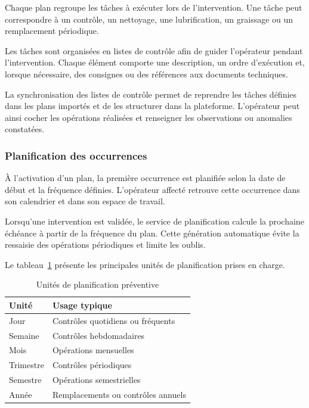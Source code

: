 Chaque plan regroupe les tâches à exécuter lors de l'intervention. Une tâche peut correspondre à un contrôle, un nettoyage, une lubrification, un graissage ou un remplacement périodique.

Les tâches sont organisées en listes de contrôle afin de guider l'opérateur pendant l'intervention. Chaque élément comporte une description, un ordre d'exécution et, lorsque nécessaire, des consignes ou des références aux documents techniques.

La synchronisation des listes de contrôle permet de reprendre les tâches définies dans les plans importés et de les structurer dans la plateforme. L'opérateur peut ainsi cocher les opérations réalisées et renseigner les observations ou anomalies constatées.
\subsubsection{Planification des occurrences}

À l'activation d'un plan, la première occurrence est planifiée selon la date de début et la fréquence définies. L'opérateur affecté retrouve cette occurrence dans son calendrier et dans son espace de travail.

Lorsqu'une intervention est validée, le service de planification calcule la prochaine échéance à partir de la fréquence du plan. Cette génération automatique évite la ressaisie des opérations périodiques et limite les oublis.

Le tableau~\ref{tab:unites-frequence} présente les principales unités de planification prises en charge.

\begin{table}[H]
\centering
\caption{Unités de planification préventive}
\label{tab:unites-frequence}
\small
\begin{tabularx}{0.8\textwidth}{|p{3.8cm}|X|}
\hline
\textbf{Unité} & \textbf{Usage typique} \\
\hline
Jour & Contrôles quotidiens ou fréquents \\
\hline
Semaine & Contrôles hebdomadaires \\
\hline
Mois & Opérations mensuelles \\
\hline
Trimestre & Contrôles périodiques \\
\hline
Semestre & Opérations semestrielles \\
\hline
Année & Remplacements ou contrôles annuels \\
\hline
\end{tabularx}
\end{table}

